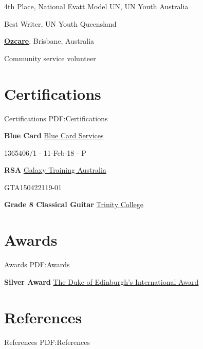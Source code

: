 \documentclass[a4paper,10pt,oneside]{article}
\begin{document}
\begin{body}
\par
4th Place, National Evatt Model UN, UN Youth Australia
\hfill
{}

\par
Best Writer, UN Youth Queensland 
\hfill
{}





\EntryGap
\href{http://www.ozcare.org.au/}
{\textbf{Ozcare}},
Brisbane, Australia
\par
Community service volunteer
\hfill
{}



\section
{Certifications}
{Certifications}
{PDF:Certifications}



\textbf{Blue Card}
\href{https://www.bluecard.qld.gov.au/}{Blue Card Services}
\hfill
{}
\begin{detail}
1365406/1 - 11-Feb-18 - P
\end{detail}

\EntryGap
\textbf{RSA}
\href{http://galaxytraining.com.au/}{Galaxy Training Australia}
\hfill
{}
\begin{detail}
GTA150422119-01
\end{detail}

\EntryGap
\textbf{Grade 8 Classical Guitar}
\href{http://www.trinitycollege.com/}{Trinity College}
\hfill
{}






\section
{Awards}
{Awards}
{PDF:Awards}



\textbf{Silver Award}
\href{http://www.dukeofed.com.au/}{The Duke of Edinburgh’s International Award}
\hfill
{}





\section
{References}
{References}
{PDF:References}


\end{body}
\end{document}
